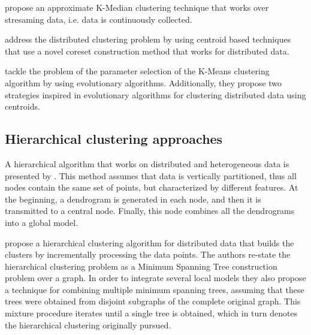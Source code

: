 \documentclass[a4paper]{article}
\begin{document}
\cite{ZLW08} propose an approximate K-Median clustering technique that works over stresaming data, i.e. data is continuously collected. 

\cite{BEL13} address the distributed clustering problem by using centroid based techniques that use a novel coreset construction method that works for distributed data.

\cite{NC14} tackle the problem of the parameter selection of the K-Means clustering algorithm by using evolutionary algorithms. Additionally, they propose two strategies inspired in evolutionary algorithms for clustering distributed data using centroids. 

\subsection{Hierarchical clustering approaches}

A hierarchical algorithm that works on distributed and heterogeneous data is presented by \cite{JK00}. This method assumes that data is vertically partitioned, thus all nodes contain the same set of points, but characterized by different features. At the beginning, a dendrogram is generated in each node, and then it is transmitted to a central node. Finally, this node combines all the dendrograms into a global model.  


\cite{JCHAC15} propose a hierarchical clustering algorithm for distributed data that builds the clusters by incrementally processing the data points. The authors re-state the hierarchical clustering problem as a Minimum Spanning Tree construction problem over a graph. In order to integrate several local models they also propose a technique for combining multiple minimum spanning trees, assuming that these trees were obtained from disjoint subgraphs of the complete original graph. This mixture procedure iterates until a single tree is obtained, which in turn denotes the hierarchical clustering originally pursued. 
\end{document}
